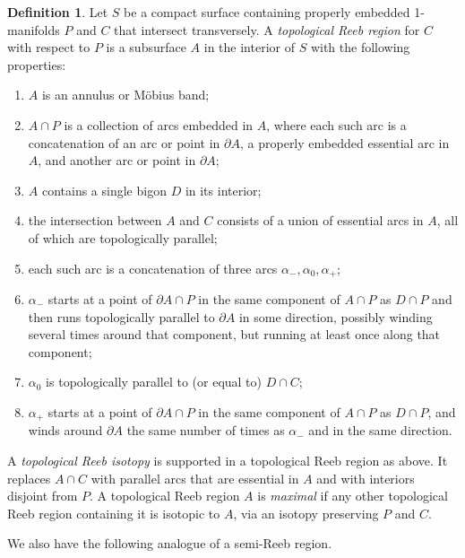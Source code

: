 \documentclass[oneside]{amsart}
\numberwithin{equation}{section}
\theoremstyle{plain}
\theoremstyle{definition}
\newtheorem{definition}[equation]{Definition}
\begin{document}
\begin{definition}
Let $S$ be a compact surface containing properly embedded 1-manifolds $P$ and $C$ that intersect transversely. A \emph{topological Reeb region} for $C$ with respect to $P$ is a subsurface $A$ in the interior of $S$ with the following properties:
\begin{enumerate}
\item $A$ is an annulus or M\"obius band;
\item $A \cap P$ is a collection of arcs embedded in $A$, where each such arc is a concatenation of an arc or point in $\partial A$, a properly embedded essential arc in $A$, and another arc or point in $\partial A$;
\item $A$ contains a single bigon $D$ in its interior;
\item the intersection between $A$ and $C$ consists of a union of essential arcs in $A$, all of which are topologically parallel;
\item each such arc is a concatenation of three arcs $\alpha_-, \alpha_0, \alpha_+$;
\item $\alpha_-$ starts at a point of $\partial A \cap P$ in the same component of $A \cap P$ as $D \cap P$ and then runs topologically parallel to $\partial A$ in some direction, possibly winding several times around that component, but running at least once along that component;
\item $\alpha_0$ is topologically parallel to (or equal to) $D \cap C$;
\item $\alpha_+$ starts at a point of $\partial A \cap P$ in the same component of $A \cap P$ as $D \cap P$, and winds around $\partial A$ the same number of times as $\alpha_-$ and in the same direction.
\end{enumerate}
A \emph{topological Reeb isotopy} is supported in a topological Reeb region as above. It replaces $A \cap C$ with parallel arcs that are essential in $A$ and with interiors disjoint from $P$. A topological Reeb region $A$ is \emph{maximal} if any other topological Reeb region containing it is isotopic to $A$, via an isotopy preserving $P$ and $C$.
\end{definition}

We also have the following analogue of a semi-Reeb region.
\end{document}
